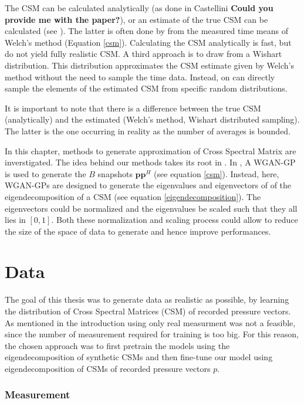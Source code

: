 \documentclass[11pt,a4paper,twoside]{report}
\begin{document}
The CSM can be calculated analytically (as done in Castellini \textbf{Could you provide me with the paper?}), or an estimate of the true CSM can be calculated (see \cite{kujawski2022fast}). The latter is often done by from the measured time means of Welch's method (Equation \ref{csm}). Calculating the CSM analytically is fast, but do not yield fully realistic CSM. A third approach is to draw from a Wishart distribution. This distribution approximates the CSM estimate given by Welch's method without the need to sample the time data. Instead, on can directly sample the elements of the estimated CSM from specific random distributions.

It is important to note that there is a difference between the true CSM (analytically) and the estimated (Welch's method, Wishart distributed sampling). The latter is the one occurring in reality as the number of averages is bounded.

In this chapter, methods to generate approximation of Cross Spectral Matrix are inverstigated. The idea behind our methods takes its root in \cite{gerstoft2020parametric}. In \cite{gerstoft2020parametric}, A WGAN-GP is used to generate the $B$ snapshots $\mathbf{p} \mathbf{p}^H$ (see equation \ref{csm}). Instead, here, WGAN-GPs are designed to generate the eigenvalues and eigenvectors of of the eigendecomposition of a CSM (see equation \ref{eigendecomposition}). The eigenvectors could be normalized and the eigenvalues be scaled such that they all lies in $[0,1]$. Both these normalization and scaling process could allow to reduce the size of the space of data to generate and hence improve performances.

\section{Data}

The goal of this thesis was to generate data as realistic as possible, by learning the distribution of Cross Spectral Matrices (CSM) of recorded pressure vectors. As mentioned in the introduction using only real measurment was not a feasible, since the number of measurement required for training is too big. For this reason, the chosen approach was to first pretrain the models using the eigendecomposition of synthetic CSMs and then fine-tune our model using eigendecomposition of CSMs of recorded pressure vectors $p$. 


\subsubsection{Measurement}
\end{document}
